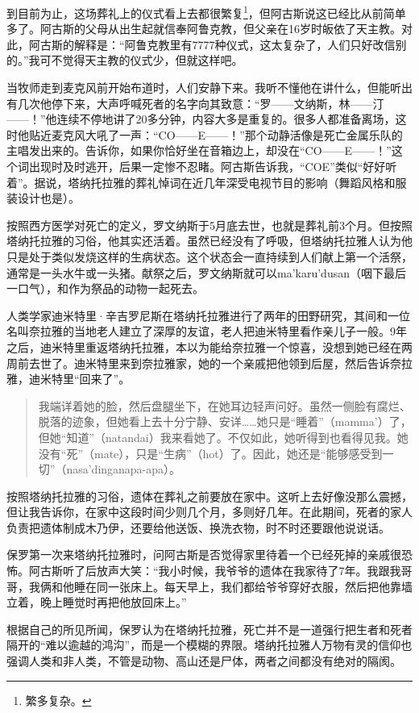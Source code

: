 \documentclass[12pt,oneside]{book}
\begin{document}
\begin{bookref}[frametitle={\cite{好好告别}}]
到目前为止，这场葬礼上的仪式看上去都很繁复\footnote{繁多复杂。}，但阿古斯说这已经比从前简单多了。阿古斯的父母从出生起就信奉阿鲁克教，但父亲在16岁时皈依了天主教。对此，阿古斯的解释是：“阿鲁克教里有7777种仪式，这太复杂了，人们只好改信别的。”我可不觉得天主教的仪式少，但就这样吧。

当牧师走到麦克风前开始布道时，人们安静下来。我听不懂他在讲什么，但能听出有几次他停下来，大声呼喊死者的名字向其致意：“罗——文纳斯，林——汀——！”他连续不停地讲了20多分钟，内容大多是重复的。很多人都准备离场，这时他贴近麦克风大吼了一声：“CO——E——！”那个动静活像是死亡金属乐队的主唱发出来的。告诉你，如果你恰好坐在音箱边上，却没在“CO——E——！”这个词出现时及时逃开，后果一定惨不忍睹。阿古斯告诉我，“COE”类似“好好听着”。据说，塔纳托拉雅的葬礼悼词在近几年深受电视节目的影响（舞蹈风格和服装设计也是）。

按照西方医学对死亡的定义，罗文纳斯于5月底去世，也就是葬礼前3个月。但按照塔纳托拉雅的习俗，他其实还活着。虽然已经没有了呼吸，但塔纳托拉雅人认为他只是处于类似发烧这样的生病状态。这个状态会一直持续到人们献上第一个活祭，通常是一头水牛或一头猪。献祭之后，罗文纳斯就可以ma’karu’dusan（咽下最后一口气），和作为祭品的动物一起死去。

人类学家迪米特里·辛吉罗尼斯在塔纳托拉雅进行了两年的田野研究，其间和一位名叫奈拉雅的当地老人建立了深厚的友谊，老人把迪米特里看作亲儿子一般。9年之后，迪米特里重返塔纳托拉雅，本以为能给奈拉雅一个惊喜，没想到她已经在两周前去世了。迪米特里来到奈拉雅家，她的一个亲戚把他领到后屋，然后告诉奈拉雅，迪米特里“回来了”。

\begin{quotation}
我端详着她的脸，然后盘腿坐下，在她耳边轻声问好。虽然一侧脸有腐烂、脱落的迹象，但她看上去十分宁静、安详……她只是“睡着”（mamma’）了，但她“知道”（natandai）我来看她了。不仅如此，她听得到也看得见我。她没有“死”（mate），只是“生病”（hot）了。因此，她还是“能够感受到一切”（nasa’dinganapa-apa）。
\end{quotation}

按照塔纳托拉雅的习俗，遗体在葬礼之前要放在家中。这听上去好像没那么震撼，但让我告诉你，在家中这段时间少则几个月，多则好几年。在此期间，死者的家人负责把遗体制成木乃伊，还要给他送饭、换洗衣物，时不时还要跟他说说话。

保罗第一次来塔纳托拉雅时，问阿古斯是否觉得家里待着一个已经死掉的亲戚很恐怖。阿古斯听了后放声大笑：“我小时候，我爷爷的遗体在我家待了7年。我跟我哥哥，我俩和他睡在同一张床上。每天早上，我们都给爷爷穿好衣服，然后把他靠墙立着，晚上睡觉时再把他放回床上。”

根据自己的所见所闻，保罗认为在塔纳托拉雅，死亡并不是一道强行把生者和死者隔开的“难以逾越的鸿沟”，而是一个模糊的界限。塔纳托拉雅人万物有灵的信仰也强调人类和非人类，不管是动物、高山还是尸体，两者之间都没有绝对的隔阂。


\end{bookref}
\end{document}
